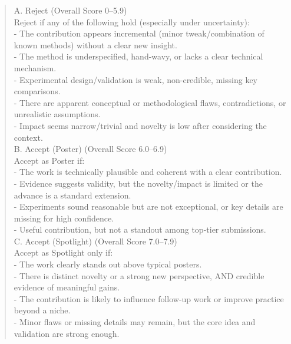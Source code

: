 \begin{quote}
\begin{tcolorbox}[breakable,colback=report!20!white, colframe=report!60!black, title=\textbf{Prompt for Report Agent (Meta-Review)}]
        A. Reject (Overall Score 0–5.9)\\
        Reject if any of the following hold (especially under uncertainty):\\
        - The contribution appears incremental (minor tweak/combination of known methods) without a clear new insight.\\
        - The method is underspecified, hand-wavy, or lacks a clear technical mechanism.\\
        - Experimental design/validation is weak, non-credible, missing key comparisons.\\
        - There are apparent conceptual or methodological flaws, contradictions, or unrealistic assumptions.\\
        - Impact seems narrow/trivial and novelty is low after considering the context.\\

        B. Accept (Poster) (Overall Score 6.0–6.9)\\
        Accept as Poster if:\\
        - The work is technically plausible and coherent with a clear contribution.\\
        - Evidence suggests validity, but the novelty/impact is limited or the advance is a standard extension.\\
        - Experiments sound reasonable but are not exceptional, or key details are missing for high confidence.\\
        - Useful contribution, but not a standout among top-tier submissions.\\

        C. Accept (Spotlight) (Overall Score 7.0–7.9)\\
        Accept as Spotlight only if:\\
        - The work clearly stands out above typical posters.\\
        - There is distinct novelty or a strong new perspective, AND credible evidence of meaningful gains.\\
        - The contribution is likely to influence follow-up work or improve practice beyond a niche.\\
        - Minor flaws or missing details may remain, but the core idea and validation are strong enough.\\


\end{tcolorbox}
\end{quote}
